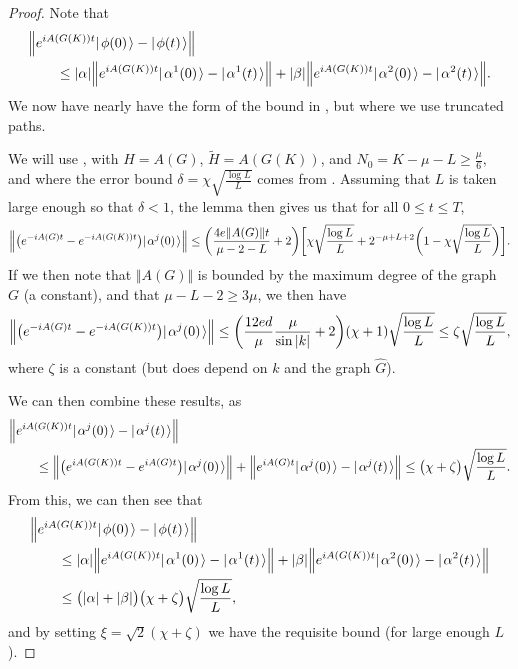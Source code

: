 \documentclass[../thesis-main/thesis-main]{subfiles}
\begin{document}
\begin{proof}
Note that
\begin{align}
  &\Big\Vert e^{i A(G(K))t} |\mspace{2mu} \phi(0) \mspace{2mu} \rangle - |\mspace{2mu} \phi(t) \mspace{2mu} \rangle \Big\Vert \nonumber\\
  &\qquad\leq |\alpha| \Big\Vert e^{i A(G(K))t} |\mspace{2mu} \alpha^1(0) \mspace{2mu} \rangle - |\mspace{2mu} \alpha^1(t) \mspace{2mu} \rangle\Big\Vert
  + |\beta| \Big\Vert e^{i A(G(K))t}  |\mspace{2mu} \alpha^2(0) \mspace{2mu} \rangle - |\mspace{2mu} \alpha^2(t) \mspace{2mu} \rangle\Big\Vert .
\end{align}
We now have nearly have the form of the bound in , but where we use truncated paths.  

We will use , with $H = A(G)$, $\tilde{H} = A(G(K))$, and $N_0 = K - \mu - L \geq \frac{\mu}{6}$, and where the error bound $\delta = \chi \sqrt{\frac{\log L}{L}}$ comes from .  Assuming that $L$ is taken large enough so that $\delta < 1$, the lemma then gives us that for all $0 \leq t \leq T$,
\begin{align}
  \Big \Vert \big(e^{- i A(G) t} - e^{- i A(G(K))t}\big)|\mspace{2mu} \alpha^j(0) \mspace{2mu} \rangle\Big\Vert \leq \bigg( \frac{4 e \Vert A(G) \Vert t}{\mu - 2 - L} + 2 \bigg) \bigg[ \chi \sqrt{\frac{\log L}{L}} + 2^{- \mu + L +2} \bigg(1 -   \chi \sqrt{\frac{\log L}{L}}  \bigg)\bigg].
\end{align}
If we then note that $\Vert A(G)\Vert$ is bounded by the maximum degree of the graph $G$ (a constant), and that $\mu - L - 2 \geq 3 \mu$, we then have 
 \begin{align}
  \Big \Vert \big(e^{- i A(G) t} - e^{- i A(G(K))t}\big)|\mspace{2mu} \alpha^j(0) \mspace{2mu} \rangle\Big\Vert \leq \bigg( \frac{12 e d }{\mu }\frac{\mu}{\sin |k|} + 2 \bigg)  (\chi +1)\sqrt{\frac{\log L}{L}}  \leq \zeta \sqrt{\frac{\log L}{L}}, 
\end{align}
where $\zeta$ is a constant (but does depend on $k$ and the graph $\widehat{G}$).

We can then combine these results, as
\begin{align}
  &\Big\Vert e^{i A(G(K))t}  |\mspace{2mu} \alpha^j(0) \mspace{2mu} \rangle - |\mspace{2mu} \alpha^j(t) \mspace{2mu} \rangle\Big\Vert \nonumber \\
  &\qquad\leq \Big\Vert\big( e^{i A(G(K))t}  - e^{ i A(G) t}\big)|\mspace{2mu} \alpha^j(0) \mspace{2mu} \rangle \Big\Vert  + \Big\Vert e^{i A(G)t}  |\mspace{2mu} \alpha^j(0) \mspace{2mu} \rangle - |\mspace{2mu} \alpha^j(t) \mspace{2mu} \rangle\Big\Vert   \leq \big(\chi + \zeta \big) \sqrt{\frac{\log L}{L}}.
\end{align}
From this, we can then see that
\begin{align}
  &\Big\Vert e^{i A(G(K))t} |\mspace{2mu} \phi(0) \mspace{2mu} \rangle - |\mspace{2mu} \phi(t) \mspace{2mu} \rangle \Big\Vert \nonumber\\
  &\qquad\leq |\alpha| \Big\Vert e^{i A(G(K))t} |\mspace{2mu} \alpha^1(0) \mspace{2mu} \rangle - |\mspace{2mu} \alpha^1(t) \mspace{2mu} \rangle\Big\Vert
  + |\beta| \Big\Vert e^{i A(G(K))t}  |\mspace{2mu} \alpha^2(0) \mspace{2mu} \rangle - |\mspace{2mu} \alpha^2(t) \mspace{2mu} \rangle\Big\Vert \\
  & \qquad \leq \big( |\alpha| + |\beta| \big) \big( \chi + \zeta \big)  \sqrt{\frac{\log L}{L}},
\end{align}
and by setting $\xi = \sqrt{2}(\chi + \zeta)$ we have the requisite bound (for large enough $L$).


\end{proof}
\end{document}
